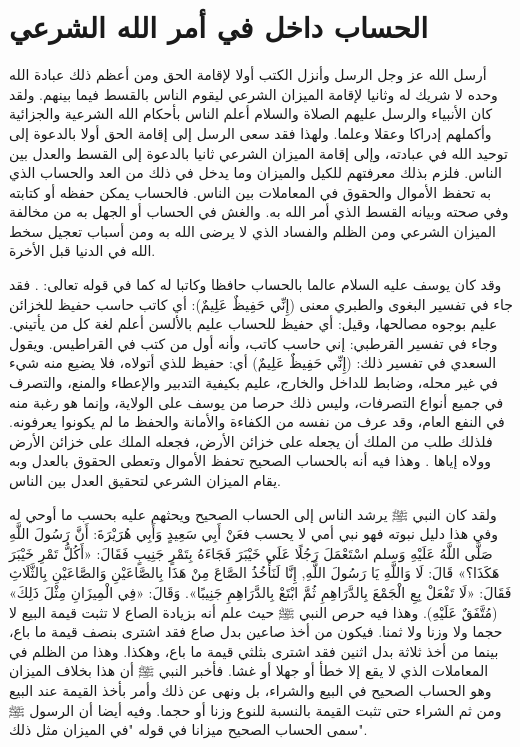 \section{الحساب داخل في أمر الله الشرعي}

أرسل الله عز وجل الرسل وأنزل الكتب أولا لإقامة الحق ومن أعظم ذلك عبادة الله وحده لا شريك له وثانيا لإقامة الميزان الشرعي ليقوم الناس بالقسط فيما بينهم. ولقد كان الأنبياء والرسل عليهم الصلاة والسلام أعلم الناس بأحكام الله الشرعية والجزائية وأكملهم إدراكا وعقلا وعلما. ولهذا فقد سعى الرسل إلى إقامة الحق أولا بالدعوة إلى توحيد الله في عبادته، وإلى إقامة الميزان الشرعي ثانيا بالدعوة إلى القسط والعدل بين الناس. فلزم بذلك معرفتهم للكيل والميزان وما يدخل في ذلك من العد والحساب الذي به تحفظ الأموال والحقوق في المعاملات بين الناس. فالحساب يمكن حفظه أو كتابته وفي صحته وبيانه القسط الذي أمر الله به. والغش في الحساب أو الجهل به من مخالفة الميزان الشرعي ومن الظلم والفساد الذي لا يرضى الله به ومن أسباب تعجيل سخط الله في الدنيا قبل الأخرة. 

وقد كان يوسف عليه السلام عالما بالحساب حافظا وكاتبا له كما في قوله تعالى: \quranayah*[12][55]{\footnotesize \surahname*[12]}. فقد جاء في تفسير البغوى والطبري معنى (إِنِّي حَفِيظٌ عَلِيمٌ): أي كاتب حاسب حفيظ للخزائن عليم بوجوه مصالحها، وقيل: أي حفيظ للحساب عليم بالألسن أعلم لغة كل من يأتيني. وجاء في تفسير القرطبي: إني حاسب كاتب، وأنه أول من كتب في القراطيس. ويقول السعدي في تفسير ذلك: (إِنِّي حَفِيظٌ عَلِيمٌ) أي: حفيظ للذي أتولاه، فلا يضيع منه شيء في غير محله، وضابط للداخل والخارج، عليم بكيفية التدبير والإعطاء والمنع، والتصرف في جميع أنواع التصرفات، وليس ذلك حرصا من يوسف على الولاية، وإنما هو رغبة منه في النفع العام، وقد عرف من نفسه من الكفاءة والأمانة والحفظ ما لم يكونوا يعرفونه. فلذلك طلب من الملك أن يجعله على خزائن الأرض، فجعله الملك على خزائن الأرض وولاه إياها \href{https://shamela.ws/book/42/841#p5}{\faExternalLink} \cite{tafsir_Saadi}. وهذا فيه أنه بالحساب الصحيح تحفظ الأموال وتعطى الحقوق بالعدل وبه يقام الميزان الشرعي لتحقيق العدل بين الناس.

ولقد كان النبي ﷺ يرشد الناس إلى الحساب الصحيح ويحثهم عليه بحسب ما أوحي له وفي هذا دليل نبوته فهو نبي أمي لا يحسب فعَنْ أَبِي سَعِيدٍ وَأَبِي هُرَيْرَةَ: أَنَّ رَسُولَ اللَّهِ صَلَّى اللَّهُ عَلَيْهِ وَسلم اسْتَعْمَلَ رَجُلًا عَلَى خَيْبَرَ فَجَاءَهُ بِتَمْرٍ جَنِيبٍ فَقَالَ: «أَكُلُّ تَمْرِ خَيْبَرَ هَكَذَا؟» قَالَ: لَا وَاللَّهِ يَا رَسُولَ اللَّهِ, إِنَّا لَنَأْخُذُ الصَّاعَ مِنْ هَذَا بِالصَّاعَيْنِ وَالصَّاعَيْنِ بِالثَّلَاثِ فَقَالَ: «لَا تَفْعَلْ بِعِ الْجَمْعَ بِالدَّرَاهِمِ ثُمَّ ابْتَعْ بِالدَّرَاهِمِ جَنِيبًا». وَقَالَ: «فِي الْمِيزَانِ مِثْلَ ذَلِكَ» {\footnotesize (مُتَّفَقٌ عَلَيْهِ)}.
وهذا فيه حرص النبي ﷺ حيث علم أنه بزيادة الصاع لا تثبت قيمة البيع لا حجما ولا وزنا ولا ثمنا. فيكون من أخذ صاعين بدل صاع فقد اشترى بنصف قيمة ما باع، بينما من أخذ ثلاثة بدل اثنين فقد اشترى بثلثي قيمة ما باع، وهكذا. وهذا من الظلم في المعاملات الذي لا يقع إلا خطأ أو جهلا أو غشا. فأخبر النبي ﷺ أن هذا بخلاف الميزان وهو الحساب الصحيح في البيع والشراء، بل ونهى عن ذلك وأمر بأخذ القيمة عند البيع ومن ثم الشراء حتى تثبت القيمة بالنسبة للنوع وزنا أو حجما. وفيه أيضا أن الرسول ﷺ سمى الحساب الصحيح ميزانا في قوله "في الميزان مثل ذلك". 

